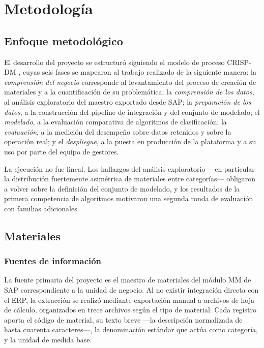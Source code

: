 \chapter{Metodología}

\section{Enfoque metodológico}
El desarrollo del proyecto se estructuró siguiendo el modelo de proceso CRISP-DM \cite{wirth2000}, cuyas seis fases se mapearon al trabajo realizado de la siguiente manera: la \textit{comprensión del negocio} corresponde al levantamiento del proceso de creación de materiales y a la cuantificación de su problemática; la \textit{comprensión de los datos}, al análisis exploratorio del maestro exportado desde SAP; la \textit{preparación de los datos}, a la construcción del pipeline de integración y del conjunto de modelado; el \textit{modelado}, a la evaluación comparativa de algoritmos de clasificación; la \textit{evaluación}, a la medición del desempeño sobre datos retenidos y sobre la operación real; y el \textit{despliegue}, a la puesta en producción de la plataforma y a su uso por parte del equipo de gestores.

La ejecución no fue lineal. Los hallazgos del análisis exploratorio —en particular la distribución fuertemente asimétrica de materiales entre categorías— obligaron a volver sobre la definición del conjunto de modelado, y los resultados de la primera competencia de algoritmos motivaron una segunda ronda de evaluación con familias adicionales.

\section{Materiales}

\subsection{Fuentes de información}
La fuente primaria del proyecto es el maestro de materiales del módulo MM de SAP correspondiente a la unidad de negocio. Al no existir integración directa con el ERP, la extracción se realizó mediante exportación manual a archivos de hoja de cálculo, organizados en trece archivos según el tipo de material. Cada registro aporta el código de material, su texto breve —la descripción normalizada de hasta cuarenta caracteres—, la denominación estándar que actúa como categoría, y la unidad de medida base.

